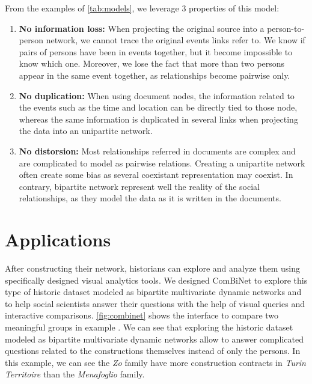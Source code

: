 \documentclass{vgtc}                          %
\newcommand{\modelplural}{bipartite multivariate dynamic networks\xspace}
\begin{document}
From the examples of \autoref{tab:models}, we leverage 3 properties of this model:
\begin{enumerate}[noitemsep]
    \item \textbf{No information loss:} When projecting the original source into a person-to-person network, we cannot trace the original events links refer to. We know if pairs of persons have been in events together, but it become impossible to know which one. Moreover, we lose the fact that more than two persons appear in the same event together, as relationships become pairwise only.   
    \item \textbf{No duplication:} When using document nodes, the information related to the events such as the time and location can be directly tied to those node, whereas the same information is duplicated in several links when projecting the data into an unipartite network.
    \item \textbf{No distorsion:} Most relationships referred in documents are complex and are complicated to model as pairwise relations. Creating a unipartite network often create some bias as several coexistant representation may coexist. In contrary, bipartite network represent well the reality of the social relationships, as they model the data as it is written in the documents.
\end{enumerate}


\section{Applications}

After constructing their network, historians can explore and analyze them using specifically designed visual analytics tools. 
We designed ComBiNet \cite{pister2022visual} to explore this type of historic dataset modeled as bipartite multivariate dynamic networks and to help social scientists answer their questions with the help of visual queries and interactive comparisons. \autoref{fig:combinet} shows the interface to compare two meaningful groups in example \pascal. We can see that exploring the historic dataset modeled as \modelplural allow to answer complicated questions related to the constructions themselves instead of only the persons. In this example, we can see the \textit{Zo} family have more construction contracts in \textit{Turin Territoire} than the \textit{Menafoglio} family.
\end{document}
